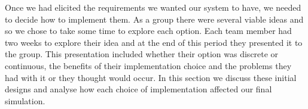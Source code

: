 \documentclass{article}
\begin{document}
	Once we had elicited the requirements we wanted our system to have, we needed to decide how to implement them. As a group there were several viable ideas and so we chose to take some time to explore each option. Each team member had two weeks to explore their idea and at the end of this period they presented it to the group. This presentation included whether their option was discrete or continuous, the benefits of their implementation choice and the problems they had with it or they thought would occur. In this section we discuss these initial designs and analyse how each choice of implementation affected our final simulation. 
%		
%				
%
	
\end{document}
